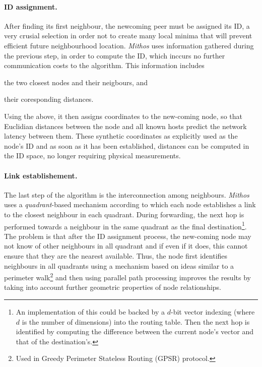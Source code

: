\documentclass[a4paper,10pt]{article}
\begin{document}
\paragraph{ID assignment.} After finding its first neighbour, the newcoming peer must be assigned its ID, a very crusial selection in order not to create many local minima that will prevent efficient future neighbourhood location. \emph{Mithos} uses information gathered during the previous step, in order to compute the ID, which inccurs no further communication costs to the algorithm. This information includes
\begin{inparaenum}
  \item the two closest nodes and their neigbours, and 
  \item their coresponding distances.
\end{inparaenum}
Using the above, it then assigns coordinates to the new-coming node, so that Euclidian distances between the node and all known hosts predict the network latency between them\cite{cox_vivaldi_2004}. These synthetic coordinates as explicitly used as the node's ID and as soon as it has been established, distances can be computed in the ID space, no longer requiring physical measurements.
\paragraph{Link establishement.} The last step of the algorithm is the interconnection among neighbours. \emph{Mithos} uses a \emph{quadrant}-based mechanism according to which each node establishes a link to the closest neighbour in each quadrant. During forwarding, the next hop is performed towards a neighbour in the same quadrant as the final destination\footnote{An implementation of this could be backed by a $d$-bit vector indexing (where $d$ is the number of dimensions) into the routing table. Then the next hop is identified by computing the difference between the current node's vector and that of the destination's.}. The problem is that after the ID assignment process, the new-coming node may not know of other neighbours in all quadrant and if even if it does, this cannot ensure that they are the nearest available. Thus, the node first identifies neighbours in all quadrants using a mechanism based on ideas similar to a perimeter walk\footnote{Used in Greedy Perimeter Stateless Routing (GPSR) protocol.} and then using parallel path processing improves the results by taking into account further geometric properties of node relationships.
\end{document}
